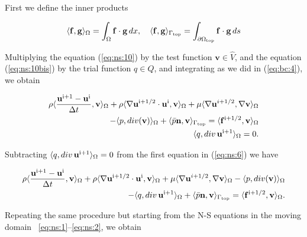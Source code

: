 \documentclass[a4paper,11pt,openright,twoside]{book}
\begin{document}
First we define the inner products

\[
\langle \mathbf{f}, \mathbf{g} \rangle_\Omega = \int_\Omega \mathbf{f} \cdot \mathbf{g} \, dx, \quad
\langle \mathbf{f}, \mathbf{g} \rangle_{\Gamma_{\rm top}} = \int_{\partial \Omega_{\rm top}} \mathbf{f} \cdot \mathbf{g} \, ds
\]

Multiplying the equation (\ref{eq:ns:10}) by the test function $\mathbf{v} \in \hat{V}$, and the equation (\ref{eq:ns:10bis}) by the trial function $q \in Q$, and integrating as we did in (\ref{eq:bc:4}), we obtain 

\begin{equation}
\label{eq:ns:6}
\begin{split}
\rho \langle \frac{\mathbf{u}^{\rm i+1} - \mathbf{u}^{\rm i}}{\Delta t}, \mathbf{v} \rangle_\Omega
+ \rho \langle \nabla \mathbf{u}^{\rm i+1/2} \cdot \mathbf{u}^{\rm i}, \mathbf{v} \rangle_\Omega
+ \mu \langle \nabla \mathbf{u}^{i+1/2} , \nabla \mathbf{v} \rangle_\Omega \\
- \langle p , div(\mathbf{v}) \rangle_\Omega 
+ \langle \bar{p} \mathbf{n}, \mathbf{v} \rangle_{\Gamma_{\rm top}}
= \langle \mathbf{f}^{\rm i + 1/2}, \mathbf{v} \rangle_\Omega \\
\langle q , div \, \mathbf{u}^{\rm i+1} \rangle_\Omega = 0.
\end{split}
\end{equation}

Subtracting $\langle q , div \, \mathbf{u}^{\rm i+1} \rangle_\Omega = 0$ from the first equation in (\ref{eq:ns:6}) we have

\begin{equation}
\begin{split}
\rho \langle \frac{\mathbf{u}^{\rm i+1} - \mathbf{u}^{\rm i}}{\Delta t}, \mathbf{v} \rangle_\Omega
+ \rho \langle \nabla \mathbf{u}^{\rm i+1/2} \cdot \mathbf{u}^{\rm i}, \mathbf{v} \rangle_\Omega
+ \mu \langle \nabla \mathbf{u}^{i+1/2} , \nabla \mathbf{v} \rangle_\Omega
- \langle p , div(\mathbf{v}) \rangle_\Omega \\
- \langle q , div \, \mathbf{u}^{\rm i+1} \rangle_\Omega 
+ \langle \bar{p} \mathbf{n}, \mathbf{v} \rangle_{\Gamma_{\rm top}}
= \langle \mathbf{f}^{\rm i + 1/2}, \mathbf{v} \rangle_\Omega.
\end{split}
\end{equation}

Repeating the same procedure but starting from the N-S equations in the moving domain ~\eqref{eq:ns:1}--\eqref{eq:ns:2}, we obtain
\end{document}
